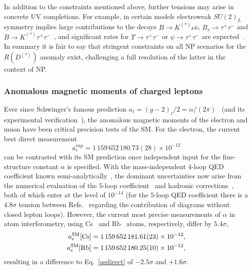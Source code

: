 \documentclass[10pt]{article}
\begin{document}
In addition to the constraints mentioned above, further tensions may arise in concrete UV completions. For example,  in certain models  electroweak $SU(2)_L$ symmetry implies large contributions to the decays $B\to K^{(*)}\nu\bar\nu$, $B_s\to\tau^+\tau^-$ and $B\to K^{(*)}\tau^+\tau^-$~\cite{Calibbi:2015kma,Crivellin:2017zlb}, and significant rates for  $\Upsilon\to\tau^+\tau^-$ or $\psi\to\tau^+\tau^-$ are expected~\cite{Aloni:2017eny}. In summary it is fair to say that stringent constraints on all NP scenarios for the $R(D^{(*)})$ anomaly exist, challenging a full resolution of the latter in the context of NP. 


\subsubsection{Anomalous magnetic moments of charged leptons }
%
Ever since Schwinger's famous prediction $a_\ell=(g-2)_\ell/2=\alpha/(2\pi)$~\cite{Schwinger:1948iu} (and its experimental verification~\cite{Kusch:1948mvb}),
the anomalous magnetic moments of the electron and muon have been critical precision tests of the SM. For the electron, the current best direct measurement~\cite{Hanneke:2008tm}
\begin{equation}
\label{aedirect}
 a_e^\text{exp}=1\,159\,652\,180.73(28)\times 10^{-12}
\end{equation}
can be contrasted with its SM prediction once independent input for the fine-structure constant $\alpha$ is specified. With the mass-independent $4$-loop QED coefficient known semi-analytically~\cite{Laporta:2017okg}, the dominant uncertainties now arise from the numerical evaluation of the $5$-loop coefficient~\cite{Aoyama:2019ryr} and hadronic corrections~\cite{Keshavarzi:2019abf}, both of which enter at the level of $10^{-14}$ (for the $5$-loop QED coefficient there is a $4.8\sigma$ tension between Refs.~\cite{Aoyama:2019ryr,Volkov:2019phy} regarding the contribution of diagrams without closed lepton loops). However, the current most precise measurements of $\alpha$ in atom interferometry, using Cs~\cite{Parker:2018vye} and Rb~\cite{Morel:2020dww} atoms, respectively, differ by $5.4\sigma$,
\begin{align}
a_e^\text{SM}[\text{Cs}]&=1\,159\,652\,181.61(23)\times 10^{-12},\notag\\
 a_e^\text{SM}[\text{Rb}]&=1\,159\,652\,180.25(10)\times 10^{-12},
 \label{gm2:electrons}
\end{align}
resulting in a difference to Eq.~\eqref{aedirect} of $-2.5\sigma$ and $+1.6\sigma$.
\end{document}
